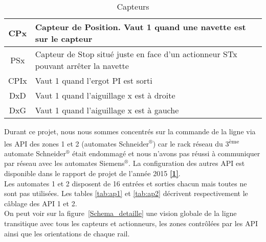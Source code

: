 \documentclass[a4paper,french, titlepage]{book}
\begin{document}
\begin{table}[H]

 	  
\begin{center}
	\begin{tabular}{|c||l|}
	\hline CPx   & Capteur de Position. Vaut 1 quand une navette est sur le capteur \\
	\hline PSx   & Capteur de Stop situé juste en face d'un actionneur STx pouvant arrêter la navette \\
	\hline CPIx  & Vaut 1 quand l'ergot PI est sorti      \\
	\hline DxD   & Vaut 1 quand l'aiguillage x est à droite         \\
	\hline DxG   & Vaut 1 quand l'aiguillage x est à gauche \\
	\hline
	\end{tabular}        
\end{center}
\caption{\label{tab:capteurs}Capteurs}
\end{table}

Durant ce projet, nous nous sommes concentrés sur la commande de la ligne via les API des zones 1 et 2 (automates Schneider$^{\circledR}$) car le rack réseau du 3\textsuperscript{ème} automate Schneider$^{\circledR}$ était endommagé et nous n'avons pas réussi à communiquer par réseau avec les automates Siemens$^{\circledR}$. La configuration des autres API est disponible dans le rapport de projet de l'année 2015 \hyperref[biblio]{\textbf{[1]}}.\\

Les automates 1 et 2 disposent de 16 entrées et sorties chacun mais toutes ne sont pas utilisées. Les tables \ref{tab:ap1} et \ref{tab:ap2} décrivent respectivement le câblage des API 1 et 2. \\

On peut voir sur la figure~\ref{Schema_detaille} une vision globale de la ligne transitique avec tous les capteurs et actionneurs, les zones contrôlées par les API ainsi que les orientations de chaque rail.
\end{document}
